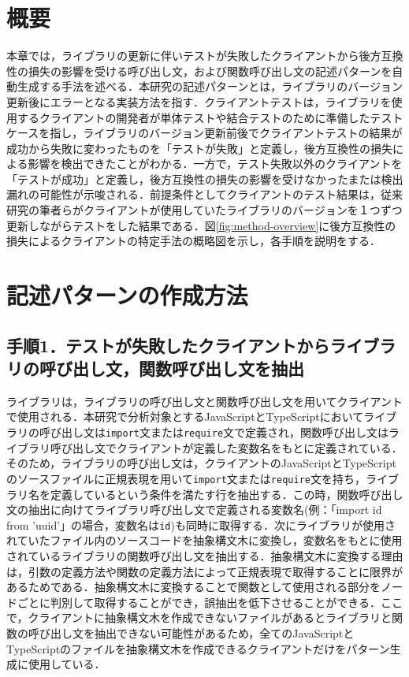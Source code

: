 \documentclass[11pt]{jreport}
\begin{document}
\section{概要}
本章では，ライブラリの更新に伴いテストが失敗したクライアントから後方互換性の損失の影響を受ける呼び出し文，および関数呼び出し文の記述パターンを自動生成する手法を述べる．本研究の記述パターンとは，ライブラリのバージョン更新後にエラーとなる実装方法を指す．クライアントテストは，ライブラリを使用するクライアントの開発者が単体テストや結合テストのために準備したテストケースを指し，ライブラリのバージョン更新前後でクライアントテストの結果が成功から失敗に変わったものを「テストが失敗」と定義し，後方互換性の損失による影響を検出できたことがわかる．一方で，テスト失敗以外のクライアントを「テストが成功」と定義し，後方互換性の損失の影響を受けなかったまたは検出漏れの可能性が示唆される．前提条件としてクライアントのテスト結果は，従来研究\cite{matsuda}の筆者らがクライアントが使用していたライブラリのバージョンを１つずつ更新しながらテストをした結果である．図\ref{fig:method-overview}に後方互換性の損失によるクライアントの特定手法の概略図を示し，各手順を説明をする．

\section{記述パターンの作成方法}

\subsection{手順1．テストが失敗したクライアントからライブラリの呼び出し文，関数呼び出し文を抽出}
ライブラリは，ライブラリの呼び出し文と関数呼び出し文を用いてクライアントで使用される．本研究で分析対象とするJavaScriptとTypeScriptにおいてライブラリの呼び出し文は\texttt{import}文または\texttt{require}文で定義され，関数呼び出し文はライブラリ呼び出し文でクライアントが定義した変数名をもとに定義されている．そのため，ライブラリの呼び出し文は，クライアントのJavaScriptとTypeScriptのソースファイルに正規表現を用いて\texttt{import}文または\texttt{require}文を持ち，ライブラリ名を定義しているという条件を満たす行を抽出する．この時，関数呼び出し文の抽出に向けてライブラリ呼び出し文で定義される変数名(例：「import id from 'uuid'」の場合，変数名は\texttt{id})も同時に取得する．次にライブラリが使用されていたファイル内のソースコードを抽象構文木に変換し，変数名をもとに使用されているライブラリの関数呼び出し文を抽出する．抽象構文木に変換する理由は，引数の定義方法や関数の定義方法によって正規表現で取得することに限界があるためである．抽象構文木に変換することで関数として使用される部分をノードごとに判別して取得することができ，誤抽出を低下させることができる．ここで，クライアントに抽象構文木を作成できないファイルがあるとライブラリと関数の呼び出し文を抽出できない可能性があるため，全てのJavaScriptとTypeScriptのファイルを抽象構文木を作成できるクライアントだけをパターン生成に使用している．
\end{document}
